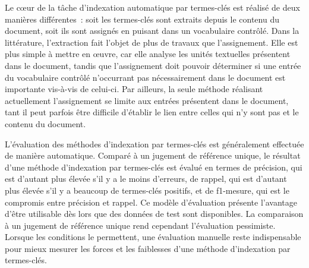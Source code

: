     Le c\oe{}ur de la tâche d'indexation automatique par termes-clés est
    réalisé de deux manières différentes~: soit les termes-clés sont extraits
    depuis le contenu du document, soit ils sont assignés en puisant dans un
    vocabulaire contrôlé. Dans la littérature, l'extraction fait l'objet de plus
    de travaux que l'assignement. Elle est plus simple à mettre en \oe{}uvre,
    car elle analyse les unités textuelles présentent dans le document, tandis
    que l'assignement doit pouvoir déterminer si une entrée du vocabulaire
    contrôlé n'occurrant pas nécessairement dans le document est importante
    vis-à-vis de celui-ci. Par ailleurs, la seule méthode réalisant actuellement
    l'assignement se limite aux entrées présentent dans le document, tant il
    peut parfois être difficile d'établir le lien entre celles qui n'y sont pas
    et le contenu du document.

    L'évaluation des méthodes d'indexation par termes-clés est généralement
    effectuée de manière automatique. Comparé à un jugement de référence unique,
    le résultat d'une méthode d'indexation par termes-clés est évalué en termes
    de précision, qui est d'autant plus élevée s'il y a le moins d'erreurs, de
    rappel, qui est d'autant plus élevée s'il y a beaucoup de termes-clés
    positifs, et de f1-mesure, qui est le compromis entre précision et rappel.
    Ce modèle d'évaluation présente l'avantage d'être utilisable dès lors que
    des données de test sont disponibles. La comparaison à un jugement de
    référence unique rend cependant l'évaluation pessimiste. Lorsque les
    conditions le permettent, une évaluation manuelle reste indispensable pour
    mieux mesurer les forces et les faiblesses d'une méthode d'indexation par
    termes-clés.

